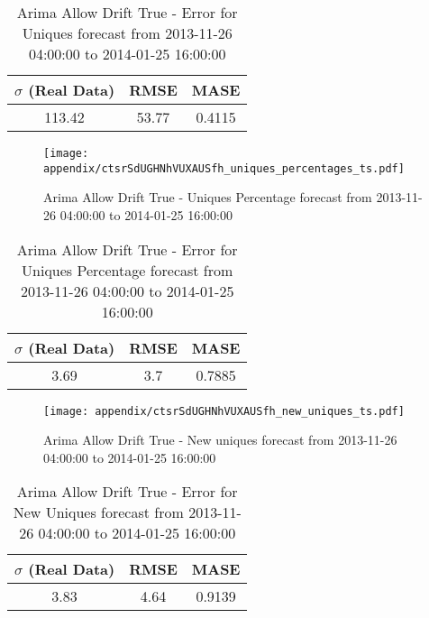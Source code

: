 \begin{table}[H]
\centering
\footnotesize
\begin{tabular}{ccc}
$\sigma$ (Real Data) & RMSE & MASE   \\ \hline
113.42 & 53.77 & 0.4115 \\
\end{tabular}

\vspace{0.5cm}

\caption[]{
Arima Allow Drift True - Error for Uniques forecast from 2013-11-26 04:00:00 to 2014-01-25 16:00:00}
\end{table}

\begin{figure}[H] \begin{center} \leavevmode
\texttt{[image: appendix/ctsrSdUGHNhVUXAUSfh\_uniques\_percentages\_ts.pdf]} \caption[]{
Arima Allow Drift True - Uniques Percentage forecast from 2013-11-26 04:00:00 to 2014-01-25 16:00:00} \label{fig:appendix/ctsrSdUGHNhVUXAUSfh_uniques_percentages_ts.pdf} \end{center}
\end{figure}

\begin{table}[H]
\centering
\footnotesize
\begin{tabular}{ccc}
$\sigma$ (Real Data) & RMSE & MASE   \\ \hline
3.69 & 3.7 & 0.7885 \\
\end{tabular}

\vspace{0.5cm}

\caption[]{
Arima Allow Drift True - Error for Uniques Percentage forecast from 2013-11-26 04:00:00 to 2014-01-25 16:00:00}
\end{table}

\begin{figure}[H] \begin{center} \leavevmode
\texttt{[image: appendix/ctsrSdUGHNhVUXAUSfh\_new\_uniques\_ts.pdf]} \caption[]{
Arima Allow Drift True - New uniques forecast from 2013-11-26 04:00:00 to 2014-01-25 16:00:00} \label{fig:appendix/ctsrSdUGHNhVUXAUSfh_new_uniques_ts.pdf} \end{center}
\end{figure}

\begin{table}[H]
\centering
\footnotesize
\begin{tabular}{ccc}
$\sigma$ (Real Data) & RMSE & MASE   \\ \hline
3.83 & 4.64 & 0.9139 \\
\end{tabular}

\vspace{0.5cm}

\caption[]{
Arima Allow Drift True - Error for New Uniques forecast from 2013-11-26 04:00:00 to 2014-01-25 16:00:00}
\end{table}

